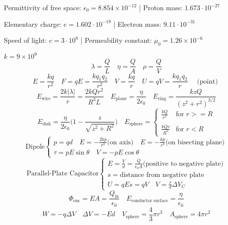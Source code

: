 \documentclass[8pt,twocolumn]{extarticle}
\begin{document}
Permittivity of free space: $\epsilon_0 = 8.854\times 10^{-12}$ |
Proton mass: $1.673\cdot 10^{-27}$

Elementary charge: $e = 1.602\cdot 10^{-19}$ |
Electron mass: $9.11\cdot 10^{-31}$

Speed of light: $c=3\cdot 10^8$ |
Permeability constant: $\mu_0 = 1.26\times 10^{-6}$

$k=9\times 10^9$
\[\lambda = \frac{Q}{L}\quad\eta = \frac{Q}{A}\quad\rho = \frac{Q}{V}\]
\[E=\frac{kq}{r^2}\quad F=qE=\frac{kq_1 q_2}{r^2}\quad V=\frac{kq}{r}\quad U=qV=\frac{kq_1 q_2}{r}\quad\text{ (point) }\]
\[E_\text{wire}=\frac{2k|\lambda |}{r}=\frac{2kQ r^2}{R^3 L}\quad E_\text{plane}=\frac{\eta}{2\epsilon_0}\quad E_\text{ring}=\frac{kzQ}{{(z^2 + r^2)}^{3/2}}\]
\[E_\text{disk}=\frac{\eta}{2\epsilon_0}\Big(1-\frac{z}{\sqrt{z^2 + R^2}}\Big)\quad E_\text{sphere}=\begin{cases}
    \frac{kQ}{r^2} & \text{for } r >= R \\ \\
    \frac{kQr}{R^3} & \text{for } r < R
\end{cases}\]
\[\text{Dipole}\begin{cases}
    p=qd\quad E=-\frac{2kp}{r^3}\text{(on axis)}\quad E=-\frac{kp}{r^3}\text{(on bisecting plane)} \\
    \tau = pE\sin\theta\quad V = -pE\cos\theta
\end{cases}\]
\[\text{Parallel-Plate Capacitor}\begin{cases}
    E=\frac{V}{d}=\frac{Q}{\epsilon_0 A}\text{(positive to negative plate)} \\
    s=\text{distance from negative plate} \\
    U=qEs=qV \quad V=\frac{s}{d}\Delta V_C
\end{cases}\]
\[\Phi_\text{enc}=EA=\frac{Q_\text{in}}{\epsilon_0}\quad E_\text{conductor surface}=\frac{\eta}{\epsilon_0}\]
\[W=-q\Delta V\quad \Delta V = -Ed\quad V_\text{sphere} = \frac{4}{3}\pi r^3\quad A_\text{sphere}=4\pi r^2\]
\end{document}
